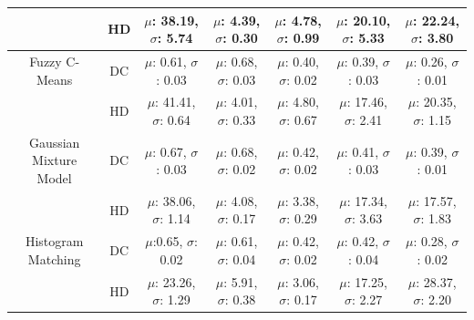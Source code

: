 \documentclass[journal]{IEEEtran}
\begin{document}
\begin{table}[h]
\begin{center}
\begin{threeparttable}
\begin{tabular}{c c c c c c c}
								&	HD	&	$\mu$: 38.19, $\sigma$: 5.74	&	$\mu$: 4.39, $\sigma$: 0.30		&	$\mu$: 4.78, $\sigma$: 0.99		&	$\mu$: 20.10, $\sigma$: 5.33	&	$\mu$: 22.24, $\sigma$: 3.80 	\\ \midrule
		Fuzzy C-Means 			&	DC	&	$\mu$: 0.61, $\sigma$: 0.03		&	$\mu$: 0.68, $\sigma$: 0.03		&	$\mu$: 0.40, $\sigma$: 0.02		&	$\mu$: 0.39, $\sigma$: 0.03		&	$\mu$: 0.26, $\sigma$: 0.01 	\\ \cmidrule(lr{1em}){2-7}
								&	HD	&	$\mu$: 41.41, $\sigma$: 0.64	&	$\mu$: 4.01, $\sigma$: 0.33		&	$\mu$: 4.80, $\sigma$: 0.67		&	$\mu$: 17.46, $\sigma$: 2.41	&	$\mu$: 20.35, $\sigma$: 1.15 	\\ \midrule
		Gaussian Mixture Model 	&	DC	&	$\mu$: 0.67, $\sigma$: 0.03		&	$\mu$: 0.68, $\sigma$: 0.02 	& 	$\mu$: 0.42, $\sigma$: 0.02		& 	$\mu$: 0.41, $\sigma$: 0.03 	& 	$\mu$: 0.39, $\sigma$: 0.01 	\\ \cmidrule(lr{1em}){2-7}
								&	HD	& 	$\mu$: 38.06, $\sigma$: 1.14 	& 	$\mu$: 4.08, $\sigma$: 0.17 	& 	$\mu$: 3.38, $\sigma$: 0.29 	& 	$\mu$: 17.34, $\sigma$: 3.63 	& 	$\mu$: 17.57, $\sigma$: 1.83 	\\ \midrule
		Histogram Matching	 	&	DC	& 	$\mu$:0.65, $\sigma$: 0.02 		& 	$\mu$: 0.61, $\sigma$: 0.04 	& 	$\mu$: 0.42, $\sigma$: 0.02 	& 	$\mu$: 0.42, $\sigma$: 0.04		& 	$\mu$: 0.28, $\sigma$: 0.02 	\\ \cmidrule(lr{1em}){2-7}
								&	HD	& 	$\mu$: 23.26, $\sigma$: 1.29	&  	$\mu$: 5.91, $\sigma$: 0.38 	& 	$\mu$: 3.06, $\sigma$: 0.17 	& 	$\mu$: 17.25, $\sigma$: 2.27	& 	$\mu$: 28.37, $\sigma$: 2.20 	\\  \bottomrule
	\end{tabular}
	\end{threeparttable}
	\end{center}
	\label{table:simDisimCoefNewDef}
	\end{table}

\end{document}

